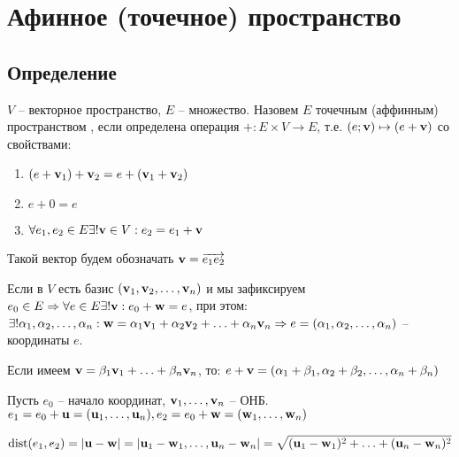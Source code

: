 \chapter{Афинное (точечное) пространство}
\section{Определение}

\begin{definition}
    $V$ -- векторное пространство, $E$ -- множество. Назовем $E$ точечным (аффинным)
    пространством , если определена операция $+: E\times V \to E$, т.е. $(e; \mathbf{v}) \mapsto (e+\mathbf{v})$
    со свойствами:
    \begin{enumerate}
        \item $(e+\mathbf{v}_1) + \mathbf{v}_2 = e + (\mathbf{v}_1 + \mathbf{v}_2)$
        \item $e + 0 = e$
        \item $\forall e_1, e_2 \in E \exists! \mathbf{v} \in V: e_2 = e_1 + \mathbf{v}$
    \end{enumerate}
    Такой вектор будем обозначать $\mathbf{v} = \overrightarrow{e_1 e_2}$


\end{definition}


\begin{definition}
    
    Если в $V$ есть базис $(\mathbf{v}_1, \mathbf{v}_2, \ldots, \mathbf{v}_n)$ и мы зафиксируем
    $e_0 \in E \Rightarrow \forall e \in E \exists! \mathbf{v}:e_0 + \mathbf{w} = e$, при этом:
        $\exists! \alpha_1, \alpha_2, \ldots, \alpha_n: \mathbf{w} = \alpha_ 1 \mathbf{v}_1 + \alpha_2 \mathbf{v}_2 + \ldots + \alpha_n \mathbf{v}_n \Rightarrow e = (\alpha_1, \alpha_2, \ldots, \alpha_n)$ -- координаты $e$.
    
        Если имеем $\mathbf{v} = \beta_1 \mathbf{v}_1 + \ldots + \beta_n \mathbf{v}_n$, то: $e + \mathbf{v} = (\alpha_1 + \beta_1, \alpha_2 + \beta_2, \ldots, \alpha_n + \beta_n)$ 
\end{definition}


\begin{definition}[Расстояние]
    Пусть $e_0$ -- начало координат, $\mathbf{v}_1, \ldots, \mathbf{v}_n$ -- ОНБ. $e_1 = e_0 + \mathbf{u} = (\mathbf{u}_1, \ldots, \mathbf{u}_n), e_2 = e_0 + \mathbf{w} = (\mathbf{w}_1, \ldots, \mathbf{w}_n)$

    \[\operatorname{dist} (e_1, e_2) = |\mathbf{u} - \mathbf{w}| = |\mathbf{u}_1 - \mathbf{w}_1, \ldots, \mathbf{u}_n - \mathbf{w}_n| = \sqrt{(\mathbf{u}_1 - \mathbf{w}_1)^2 + \ldots +(\mathbf{u}_n - \mathbf{w}_n)^2}\]
\end{definition}


